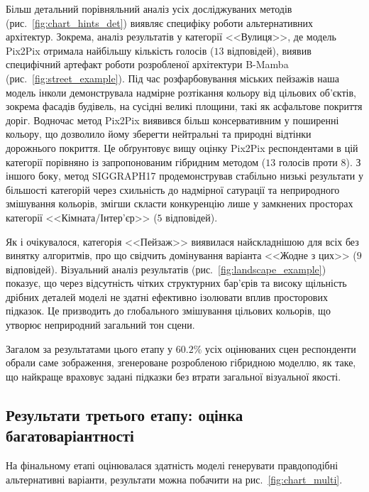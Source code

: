             Більш детальний порівняльний аналіз усіх досліджуваних методів (рис.~\ref{fig:chart_hints_det}) виявляє специфіку роботи альтернативних архітектур. 
            Зокрема, аналіз результатів у категорії <<Вулиця>>, де модель Pix2Pix отримала найбільшу кількість голосів ($13$ відповідей), виявив специфічний артефакт роботи розробленої архітектури B-Mamba (рис.~\ref{fig:street_example}). 
            Під час розфарбовування міських пейзажів наша модель інколи демонструвала надмірне розтікання кольору від цільових об'єктів, зокрема фасадів будівель, на сусідні великі площини, такі як асфальтове покриття доріг. 
            Водночас метод Pix2Pix виявився більш консервативним у поширенні кольору, що дозволило йому зберегти нейтральні та природні відтінки дорожнього покриття. 
            Це обґрунтовує вищу оцінку Pix2Pix респондентами в цій категорії порівняно із запропонованим гібридним методом ($13$ голосів проти $8$). 
            З іншого боку, метод SIGGRAPH17 продемонстрував стабільно низькі результати у більшості категорій через схильність до надмірної сатурації та неприродного змішування кольорів, змігши скласти конкуренцію лише у замкнених просторах категорії <<Кімната/Інтер'єр>> ($5$ відповідей). 

            Як і очікувалося, категорія <<Пейзаж>> виявилася найскладнішою для всіх без винятку алгоритмів, про що свідчить домінування варіанта <<Жодне з цих>> ($9$ відповідей). 
            Візуальний аналіз результатів (рис.~\ref{fig:landscape_example}) показує, що через відсутність чітких структурних бар'єрів та високу щільність дрібних деталей моделі не здатні ефективно ізолювати вплив просторових підказок. 
            Це призводить до глобального змішування цільових кольорів, що утворює неприродний загальний тон сцени.

            Загалом за результатами цього етапу у $60.2\%$ усіх оцінюваних сцен респонденти обрали саме зображення, згенероване розробленою гібридною моделлю,
            як таке, що найкраще враховує задані підказки без втрати загальної візуальної якості.

        \subsection{Результати третього етапу: оцінка багатоваріантності}
            На фінальному етапі оцінювалася здатність моделі генерувати правдоподібні альтернативні варіанти, результати можна побачити на рис.~\ref{fig:chart_multi}.
            
